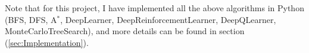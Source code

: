 \noindent Note that for this project, I have implemented all the above algorithms in Python (BFS, DFS, A$^{*}$, DeepLearner, DeepReinforcementLearner, DeepQLearner, MonteCarloTreeSearch), and more details can be found in section (\ref{sec:Implementation}).




































